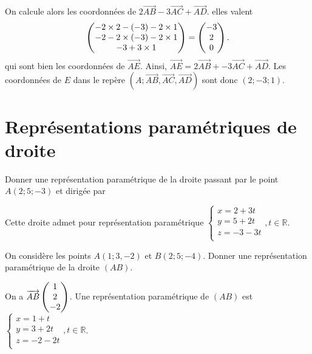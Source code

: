 \documentclass[11pt,fleqn, openany]{book} %
\begin{document}
\begin{solution}
On calcule alors les coordonnées de $2 \overrightarrow{AB}-3 \overrightarrow{AC}+\overrightarrow{AD}$. elles valent
\[\coordbe{-2 \times 2-(-3)-2 \times 1}{-2-2\times (-3)-2 \times 1}{-3+3\times 1}=\coordbe{-3}{2}{0}.\]
qui sont bien les coordonnées de $\overrightarrow{AE}$. Ainsi, $\overrightarrow{AE}= 2\overrightarrow{AB}+-3 \overrightarrow{AC}+ \overrightarrow{AD}$. Les coordonnées de $E$ dans le repère  $(A;\overrightarrow{AB},\overrightarrow{AC},\overrightarrow{AD})$ sont donc $(2;-3;1)$.\end{solution}



\section*{Représentations paramétriques de droite}

\begin{exercise}[topic=geo04]
Donner une représentation paramétrique de la droite passant par le point $A(2;5;-3)$ et dirigée par \renewcommand{\arraystretch}{1}
\end{exercise}
\begin{solution}Cette droite admet pour représentation paramétrique\renewcommand{\arraystretch}{1} \(\left\{ \begin{array}{l}x=2+3t \\ y=5+2t \\ z = -3-3t \\\end{array}\right., t \in \mathbb{R}\).\end{solution}


\begin{exercise}[topic=geo04]On considère les points $A(1;3,-2)$ et $B(2;5;-4)$. Donner une représentation paramétrique de la droite $(AB)$.\end{exercise}
\begin{solution}On a \(\overrightarrow{AB} \renewcommand{\arraystretch}{1}\begin{pmatrix}1\\2\\-2\end{pmatrix}\). Une représentation paramétrique de \((AB)\) est\renewcommand{\arraystretch}{1} \(\left\{ \begin{array}{l}x=1+t \\ y=3+2t\\ z = -2-2t \\\end{array}\right., t \in \mathbb{R}\).\end{solution}
\end{document}
